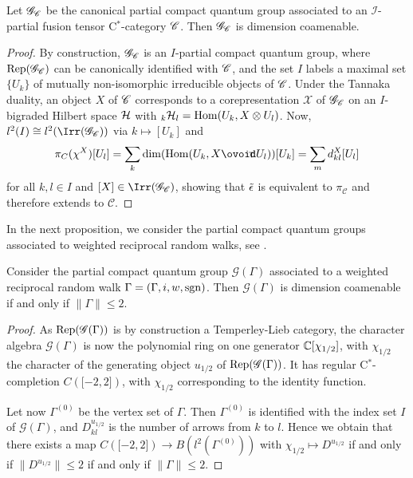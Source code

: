\begin{Prop} Let $\mathscr{G}_{\mathscr{C}}$ be the canonical partial compact quantum group associated to an $\mathcal{I}$-partial fusion tensor C$^*$-category $\mathscr{C}$. Then $\mathscr{G}_{\mathscr{C}}$ is dimension coamenable.  
\end{Prop}%
\begin{proof} 
  By construction, $\mathscr{G}_{\mathscr{C}}$ is an $I$-partial compact quantum group, where $\mathrm{Rep}(\mathscr{G}_{\mathscr{C}})$ can be canonically
  identified with $\mathscr{C}$, and the set $I$ labels a maximal set
  $\{U_{k}\}$ of mutually non-isomorphic irreducible objects of
  $\mathscr{C}$.  Under the Tannaka duality, an object $X$ of $\mathscr{C}$
  corresponds to a corepresentation $\mathscr{X}$ of
  $\mathscr{G}_{\mathscr{C}}$ on an $I$-bigraded Hilbert space $\mathcal{H}$ with
  ${}_{k}\mathcal{H}_{l} = \operatorname{Hom}(U_k,X\otimes U_l)$. Now, $l^{2}(I) \cong
  l^{2}(\Irr(\mathscr{G}_{\CatCC}))$ via $k \mapsto [U_{k}]$ and
  \begin{align*}
    \pi_{C}(\chi^{X})[U_{l}] = \sum_{k} \dim(\Hom(U_{k}, X \Circt
    U_{l}))[U_{k}] = \sum_{m} d^{X}_{kl}[U_{l}]
  \end{align*}
  for all $k,l\in I$ and $[X] \in \Irr(\mathscr{G}_{\CatCC})$, showing
  that $\operatorname{\tilde{\epsilon}}$ is equivalent to $\pi_{\mathcal{C}}$ and therefore
  extends to $\mathcal{C}$.
 \end{proof}
 
 In the next proposition, we consider the partial compact quantum groups associated to weighted reciprocal random walks, see \cite[Section 5]{DCT1}. 
 
 \begin{Prop} Consider the partial compact quantum group $\mathscr{G}(\Gamma)$ associated to a weighted reciprocal random walk $\Gamma = (\Gamma,i,w,\operatorname{\mathrm{sgn}})$. Then $\mathscr{G}(\Gamma)$ is dimension coamenable if and only if $\|\Gamma\| \leq 2$. 
 \end{Prop}%
 \begin{proof} As $\mathrm{Rep}(\mathscr{G}(\Gamma))$ is by construction a Temperley-Lieb category,  the character algebra $\mathscr{G}(\Gamma)$ is now the polynomial ring on one generator $\mathbb{C}\lbrack \chi_{1/2}\rbrack$, with $\chi_{1/2}$ the character of the generating object $u_{1/2}$ of $\mathrm{Rep}(\mathscr{G}(\Gamma))$. It has regular C$^*$-completion $C(\lbrack -2,2\rbrack)$, with $\chi_{1/2}$ corresponding to the identity function. 
 
Let now $\Gamma^{(0)}$ be the vertex set of $\Gamma$. Then $\Gamma^{(0)}$ is identified with the index set $I$ of $\mathscr{G}(\Gamma)$, and $D^{u_{1/2}}_{kl}$ is the number of arrows from $k$ to $l$. Hence we obtain that there exists a map $C(\lbrack -2,2\rbrack) \rightarrow B(l^2(\Gamma^{(0)}))$ with $\chi_{1/2}\mapsto D^{u_{1/2}}$ if and only if $\|D^{u_{1/2}}\| \leq  2$ if and only if $\|\Gamma\|\leq 2$.   
 \end{proof} 
 

